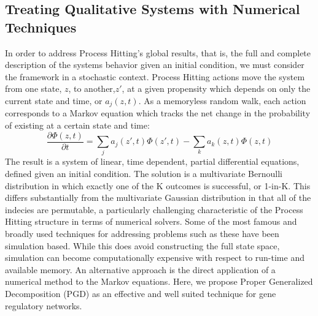 \documentclass{article}
\begin{document}
\subsection{Treating Qualitative Systems with Numerical Techniques}

In order to address Process Hitting's global results, that is, the full and complete description of the systems behavior given an initial condition, we must consider the framework in a stochastic context. Process Hitting actions move the system from one state, $z$, to another,$z\prime$, at a given propensity which depends on only the current state and time, or $a_j(z,t)$. As a memoryless random walk, each action corresponds to a Markov equation which tracks the net change in the probability of existing at a certain state and time: 
\[
\frac{\partial \Phi(z,t)}{\partial t} = \sum_j  a_j(z\prime,t)\Phi(z\prime,t) -\sum_k a_k(z,t)\Phi(z,t)
\]
The result is a system of linear, time dependent, partial differential equations, defined given an initial condition. The solution is a multivariate Bernoulli distribution in which exactly one of the K outcomes is successful, or 1-in-K. This differs substantially from the multivariate Gaussian distribution in that all of the indecies are permutable, a particularly challenging characteristic of the Process Hitting structure in terms of numerical solvers. Some of the most famous and broadly used techniques for addressing problems such as these have been simulation based. While this does avoid constructing the full state space, simulation can become computationally expensive with respect to run-time and available memory. An alternative approach is the direct application of a numerical method to the Markov equations. Here, we propose Proper Generalized Decomposition (PGD) as an effective and well suited technique for gene regulatory networks.
\end{document}
